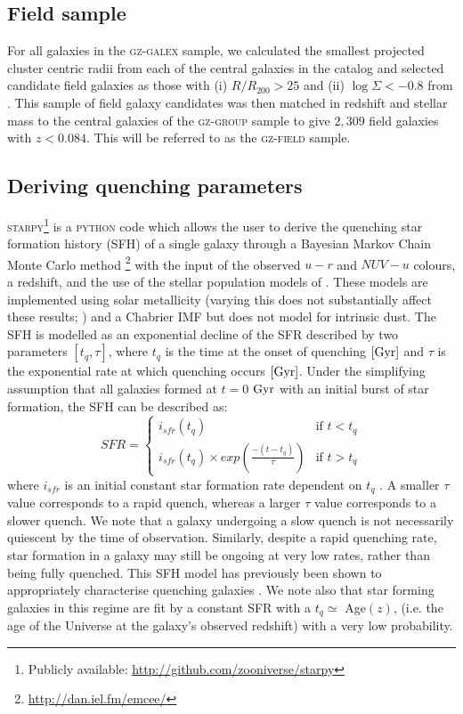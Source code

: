 \documentclass[useAMS,usenatbib]{mn2e}
\begin{document}
\subsection{Field sample}\label{sec:field}

For all galaxies in the \textsc{gz-galex} sample, we calculated the smallest projected cluster centric radii from each of the central galaxies in the  \citet{berlind06} catalog and selected candidate field galaxies as those with (i) $R/R_{200} > 25$ and (ii) $\log\Sigma < -0.8$ from \cite{baldry06}. This sample of field galaxy candidates was then matched in redshift and stellar mass to the central galaxies of the \textsc{gz-group} sample to give $2,309$ field galaxies with $z < 0.084$. This will be referred to as the \textsc{gz-field} sample. 

\subsection{Deriving quenching parameters}\label{sec:starpy}

\textsc{starpy}\footnote{Publicly available: \url{http://github.com/zooniverse/starpy}} is a \textsc{python} code which allows the user to derive the quenching star formation history (SFH) of a single galaxy through a Bayesian Markov Chain Monte Carlo method \citep{Dan}\footnote{\url{http://dan.iel.fm/emcee/}} with the input of the observed $u-r$ and $NUV-u$ colours, a redshift, and the use of the stellar population models of \cite{BC03}.  These models are implemented using solar metallicity (varying this does not substantially affect these results; \citealt{Sme2015}) and a Chabrier IMF \citep{Chab03} but does not model for intrinsic dust. The SFH is modelled as an exponential decline of the SFR described by two parameters $[t_q, \tau]$, where $t_q$ is the time at the onset of quenching $\rm{[Gyr]}$ and $\tau$ is the exponential rate at which quenching occurs $\rm{[Gyr]}$. Under the simplifying assumption that all galaxies formed at $t=0$ $\rm{ Gyr}$ with an initial burst of star formation, the SFH can be described as: 
\begin{equation}\label{sfh}
SFR =
\begin{cases}
i_{sfr}(t_q) & \text{if } t < t_q \\
i_{sfr}(t_q) \times exp{\left( \frac{-(t-t_{q})}{\tau}\right)} & \text{if } t > t_q 
\end{cases}
\end{equation}
where $i_{sfr}$ is an initial constant star formation rate dependent on $t_q$ \citep{schawinski14, smethurst15}.  A smaller $\tau$ value corresponds to a rapid quench, whereas a larger $\tau$ value corresponds to a slower quench. We note that a galaxy undergoing a slow quench is not necessarily quiescent by the time of observation. Similarly, despite a rapid quenching rate, star formation in a galaxy may still be ongoing at very low rates, rather than being fully quenched. This SFH model has previously been shown to appropriately characterise quenching galaxies \citep{Weiner06, Martin07, Noeske07,schawinski14}. We note also that star forming galaxies in this regime are fit by a constant SFR with a $t_q \simeq$ Age$(z)$, (i.e. the age of the Universe at the galaxy's observed redshift) with a very low probability.
\end{document}
